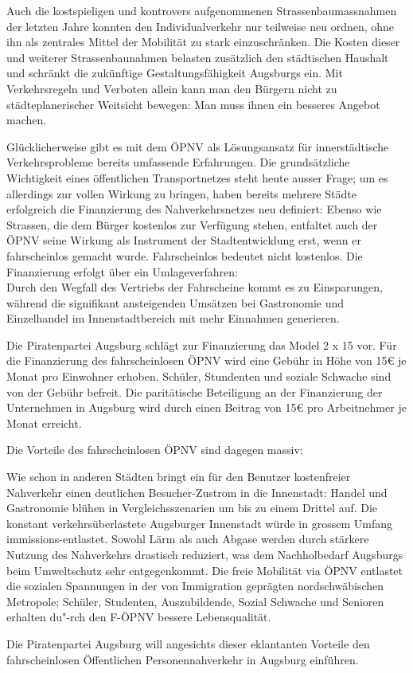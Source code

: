   Auch die kostspieligen und kontrovers aufgenommenen Strassenbaumassnahmen 
  der letzten Jahre konnten den Individualverkehr nur teilweise neu ordnen, 
  ohne ihn als zentrales Mittel der Mobilität zu stark einzuschränken. Die 
  Kosten dieser und weiterer Strassenbaunahmen belasten zusätzlich den 
  städtischen Haushalt und schränkt die zukünftige Gestaltungsfähigkeit 
  Augsburgs ein. Mit Verkehrsregeln und Verboten allein kann man den Bürgern 
  nicht zu städteplanerischer Weitsicht bewegen: Man muss ihnen ein besseres 
  Angebot machen.
  
  Glücklicherweise gibt es mit dem ÖPNV als Lösungsansatz für innerstädtische 
  Verkehrsprobleme bereits umfassende Erfahrungen. Die grundsätzliche 
  Wichtigkeit eines öffentlichen Transportnetzes steht heute ausser Frage; um 
  es allerdings zur vollen Wirkung zu bringen, haben bereits mehrere Städte 
  erfolgreich die Finanzierung des Nahverkehrsnetzes neu definiert: Ebenso wie 
  Strassen, die dem Bürger kostenlos zur Verfügung stehen, entfaltet auch der 
  ÖPNV seine Wirkung als Instrument der Stadtentwicklung erst, wenn er 
  fahrscheinlos gemacht wurde. Fahrscheinlos bedeutet nicht kostenlos. Die 
  Finanzierung erfolgt über ein Umlageverfahren:\\ Durch den Wegfall des 
  Vertriebs der Fahrscheine kommt es zu Einsparungen, während die signifikant 
  ansteigenden Umsätzen bei Gastronomie und Einzelhandel im Innenstadtbereich 
  mit mehr Einnahmen generieren.
  
  Die Piratenpartei Augsburg schlägt zur Finanzierung das Model 2 x 15 vor. 
  Für die Finanzierung des fahrscheinlosen ÖPNV wird eine Gebühr in Höhe von 
  15€ je Monat pro Einwohner erhoben. Schüler, Stundenten und soziale Schwache 
  sind von der Gebühr befreit. Die paritätische Beteiligung an der 
  Finanzierung der Unternehmen in Augsburg wird durch einen Beitrag von 15€ 
  pro Arbeitnehmer je Monat erreicht.
  
  Die Vorteile des fahrscheinlosen ÖPNV sind dagegen massiv:
  
  Wie schon in anderen Städten bringt ein für den Benutzer kostenfreier 
  Nahverkehr einen deutlichen Besucher-Zustrom in die Innenstadt: Handel und 
  Gastronomie blühen in Vergleichsszenarien um bis zu einem Drittel auf. Die 
  konstant verkehrsüberlastete Augsburger Innenstadt würde in grossem Umfang 
  immissions-entlastet. Sowohl Lärm als auch Abgase werden durch stärkere 
  Nutzung des Nahverkehrs drastisch reduziert, was dem Nachholbedarf Augsburgs 
  beim Umweltschutz sehr entgegenkommt. Die freie Mobilität via ÖPNV entlastet 
  die sozialen Spannungen in der von Immigration geprägten nordschwäbischen 
  Metropole; Schüler, Studenten, Auszubildende, Sozial Schwache und Senioren 
  erhalten du"-rch den F-ÖPNV bessere Lebensqualität.
  
  Die Piratenpartei Augsburg will angesichts dieser eklantanten Vorteile den 
  fahrscheinlosen Öffentlichen Personennahverkehr in Augsburg einführen.
